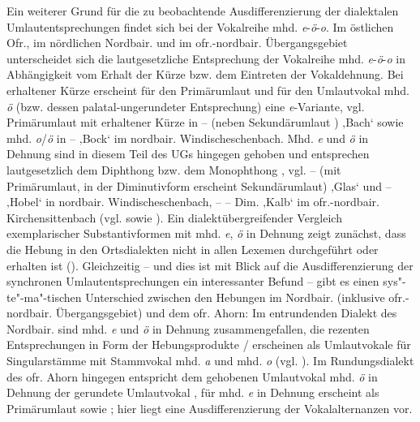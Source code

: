 Ein weiterer Grund für die zu beobachtende Ausdifferenzierung der dialektalen Umlautentsprechungen findet sich bei der Vokalreihe mhd. {\textit{e}}{{}-}{\textit{ö}}{{}-}{\textit{o}}. Im östlichen Ofr., im nördlichen Nordbair. und im ofr.-nordbair. Übergangsgebiet unterscheidet sich die lautgesetzliche Entsprechung der Vokalreihe mhd. \textit{e}{}-\textit{ö}{}-\textit{o} in Abhängigkeit vom Erhalt der Kürze bzw. dem Eintreten der Vokaldehnung. Bei erhaltener Kürze erscheint für den Primär\-umlaut und für den Umlautvokal mhd. \textit{ö} (bzw. dessen palatal-ungerundeter Entsprechung) eine \textit{e}{}-Variante, vgl. Primär\-umlaut mit erhaltener Kürze in  --  (neben Sekundär\-umlaut ) ‚Bach‘ sowie mhd. \textit{o}/\textit{ö} in   --  ‚Bock‘ im nordbair. Windischeschenbach. Mhd. \textit{e} und \textit{ö} in Dehnung sind in diesem Teil des UGs hingegen gehoben und entsprechen lautgesetzlich dem Diphthong  bzw. dem Monophthong , vgl. --  (mit Primär\-umlaut, in der Diminutivform  erscheint Sekundär\-umlaut) ‚Glas‘ und  --  ‚Hobel‘ in nordbair. Windischeschenbach,  --  -- Dim.  ‚Kalb‘ im ofr.-nordbair. Kirchensittenbach (vgl.  sowie \citealt[Karte 50 und 101]{SNOB1}).\largerpage{} Ein dialektübergreifender Vergleich exemplarischer Substantivformen mit mhd. \textit{e}, \textit{ö} in Dehnung zeigt zunächst, dass die Hebung in den Ortsdialekten nicht in allen Lexemen durchgeführt oder erhalten ist (). Gleichzeitig -- und dies ist mit Blick auf die Ausdifferenzierung der synchronen Umlautentsprechungen ein interessanter Befund -- gibt es einen sys"-te"-ma"-tischen Unterschied zwischen den Hebungen im Nordbair. (inklusive ofr.-nordbair. Übergangsgebiet) und dem ofr. Ahorn: Im entrundenden Dialekt des Nordbair. sind mhd. \textit{e} und \textit{ö} in Dehnung zusammengefallen, die rezenten Entsprechungen in Form der Hebungsprodukte / erscheinen als Umlautvokale für Singularstämme mit Stammvokal mhd. \textit{a} und mhd. \textit{o} (vgl. \citealt[73]{Roth1940}). Im Rundungsdialekt des ofr. Ahorn hingegen entspricht dem gehobenen Umlautvokal mhd. \textit{ö} in Dehnung der gerundete Umlautvokal , für mhd. \textit{e} in Dehnung erscheint als Primär\-umlaut  sowie ; hier liegt eine Ausdifferenzierung der Vokalalternanzen vor.

